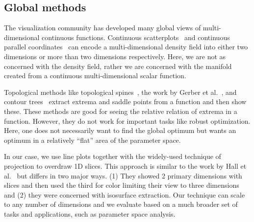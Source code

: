 \subsection{Global methods}

The visualization community has developed many global views of
multi-dimensional continuous functions. Continuous
scatterplots~\cite{Bachthaler:2008} and continuous parallel
coordinates~\cite{Heinrich:2009} can encode a multi-dimensional density field
into either two dimensions or more than two dimensions respectively.  Here, we
are not as concerned with the density field, rather we are concerned with the
manifold created from a continuous multi-dimensional scalar function. 

Topological methods like topological
spines~\cite{Correa:2011}, the work by Gerber et al.~\cite{Gerber:2010}, and
contour trees~\cite{Carr:2003a} extract extrema and saddle points from a
function and then show these. These methods are good for seeing the relative
relation of extrema in a function. However, they do not work for important
tasks like robust optimization. Here, one does not necessarily want to find the
global optimum but wants an optimum in a relatively ``flat'' area of the
parameter space. 

In our case, we use line plots
together with the widely-used technique of projection to overdraw 1D slices. This approach is similar to the work by Hall et al.~\cite{Hall:2014} but differs in two major ways. (1) They showed 2 primary dimensions with slices and then used the third for color limiting their view to three dimensions and (2) they were concerned with isosurface extraction. Our technique can scale to any number of dimensions and we evaluate based on a much broader set of tasks and applications, such as parameter space analysis. 

